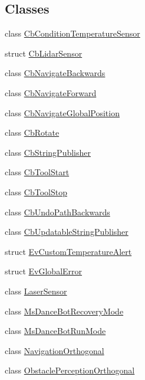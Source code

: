 \subsection*{Classes}
\begin{DoxyCompactItemize}
\item 
class \hyperlink{classsm__dance__bot_1_1CbConditionTemperatureSensor}{Cb\+Condition\+Temperature\+Sensor}
\item 
struct \hyperlink{structsm__dance__bot_1_1CbLidarSensor}{Cb\+Lidar\+Sensor}
\item 
class \hyperlink{classsm__dance__bot_1_1CbNavigateBackwards}{Cb\+Navigate\+Backwards}
\item 
class \hyperlink{classsm__dance__bot_1_1CbNavigateForward}{Cb\+Navigate\+Forward}
\item 
class \hyperlink{classsm__dance__bot_1_1CbNavigateGlobalPosition}{Cb\+Navigate\+Global\+Position}
\item 
class \hyperlink{classsm__dance__bot_1_1CbRotate}{Cb\+Rotate}
\item 
class \hyperlink{classsm__dance__bot_1_1CbStringPublisher}{Cb\+String\+Publisher}
\item 
class \hyperlink{classsm__dance__bot_1_1CbToolStart}{Cb\+Tool\+Start}
\item 
class \hyperlink{classsm__dance__bot_1_1CbToolStop}{Cb\+Tool\+Stop}
\item 
class \hyperlink{classsm__dance__bot_1_1CbUndoPathBackwards}{Cb\+Undo\+Path\+Backwards}
\item 
class \hyperlink{classsm__dance__bot_1_1CbUpdatableStringPublisher}{Cb\+Updatable\+String\+Publisher}
\item 
struct \hyperlink{structsm__dance__bot_1_1EvCustomTemperatureAlert}{Ev\+Custom\+Temperature\+Alert}
\item 
struct \hyperlink{structsm__dance__bot_1_1EvGlobalError}{Ev\+Global\+Error}
\item 
class \hyperlink{classsm__dance__bot_1_1LaserSensor}{Laser\+Sensor}
\item 
class \hyperlink{classsm__dance__bot_1_1MsDanceBotRecoveryMode}{Ms\+Dance\+Bot\+Recovery\+Mode}
\item 
class \hyperlink{classsm__dance__bot_1_1MsDanceBotRunMode}{Ms\+Dance\+Bot\+Run\+Mode}
\item 
class \hyperlink{classsm__dance__bot_1_1NavigationOrthogonal}{Navigation\+Orthogonal}
\item 
class \hyperlink{classsm__dance__bot_1_1ObstaclePerceptionOrthogonal}{Obstacle\+Perception\+Orthogonal}

\end{DoxyCompactItemize}
